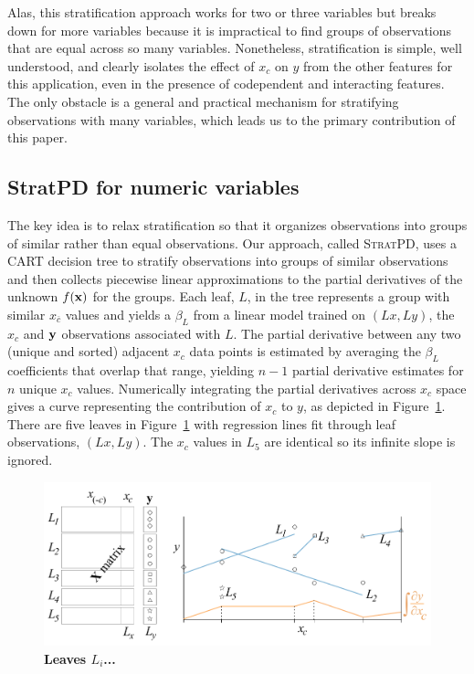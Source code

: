 \documentclass[12pt]{article}
\newcommand{\figref}[1]{Figure~\ref{#1}}
\newcommand{\spd}{\fontfamily{cmr}\textsc{\small StratPD}}
\newcommand{\xnc}{$x_{\overline{c}}$}
\begin{document}
Alas, this stratification approach works for two or three variables but breaks down for more variables because it is impractical to find groups of observations that are equal across so many variables.  Nonetheless, stratification is simple, well understood, and clearly isolates the effect of $x_c$ on $y$ from the other features for this application, even in the presence of codependent and interacting features.  The only obstacle is a general and practical mechanism for stratifying observations with many variables, which leads us to the primary contribution of this paper.

\subsection{StratPD for numeric variables}

The key idea is to relax stratification so that it organizes observations into groups of similar rather than equal observations.  Our approach, called \spd, uses a CART decision tree \cite{CART} to stratify observations into  groups of similar observations and then collects piecewise linear approximations to the partial derivatives of the unknown $f(\bf x)$ for the groups. Each leaf, $L$, in the tree represents a group with similar \xnc{} values and yields a $\beta_L$ from a linear model trained on $(Lx, Ly)$, the $x_c$ and $\bf y$ observations associated with $L$.  The partial derivative between any two (unique and sorted) adjacent $x_c$ data points is estimated by averaging the $\beta_L$ coefficients that overlap that range, yielding $n-1$ partial derivative estimates for $n$ unique $x_c$ values.  Numerically integrating the partial derivatives across $x_c$ space gives a curve representing the contribution of $x_c$ to $y$, as depicted in \figref{fig:leaves}. There are five leaves in \figref{fig:leaves} with regression lines fit through leaf observations, $(Lx, Ly)$. The $x_c$ values in $L_5$ are identical so its infinite slope is ignored.

\begin{figure}[htbp]
\begin{center}
\includegraphics[scale=0.7]{images/leaves.pdf}
\caption{{\bf  Leaves $L_i$...}}
\label{fig:leaves}
\end{center}
\end{figure}
\end{document}
